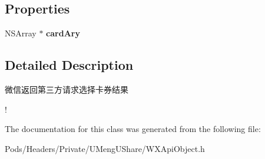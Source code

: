 \subsection*{Properties}
\begin{DoxyCompactItemize}
\item 
\mbox{\label{interface_w_x_choose_card_resp_adc041cf0b391f4b638f5508bf844c5a8}} 
N\+S\+Array $\ast$ {\bfseries card\+Ary}
\end{DoxyCompactItemize}


\subsection{Detailed Description}
微信返回第三方请求选择卡券结果 

! 

The documentation for this class was generated from the following file\+:\begin{DoxyCompactItemize}
\item 
Pods/\+Headers/\+Private/\+U\+Meng\+U\+Share/W\+X\+Api\+Object.\+h\end{DoxyCompactItemize}

